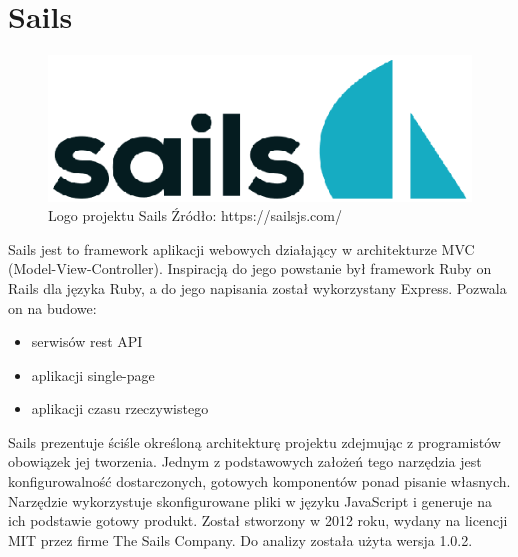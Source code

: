 \documentclass[12pt]{report}
\begin{document}
   \section{Sails}
    \begin{figure}[!hb]
      \centering
      \includegraphics[width=\textwidth,height=\textheight,keepaspectratio]{logo_sails.png} 
      \caption{Logo projektu Sails \newline Źródło: https://sailsjs.com/}
    \end{figure}
    Sails jest to framework aplikacji webowych działający w architekturze MVC (Model-View-Controller).
    Inspiracją do jego powstanie był framework Ruby on Rails dla języka Ruby, a do jego napisania został wykorzystany Express.
    Pozwala on na budowe:
     \begin{itemize}
      \item serwisów rest API
      \item aplikacji single-page 
      \item aplikacji czasu rzeczywistego
    \end{itemize} 
    Sails prezentuje ściśle określoną architekturę projektu zdejmując z programistów obowiązek jej tworzenia.
    Jednym z podstawowych założeń tego narzędzia jest konfigurowalność dostarczonych, gotowych komponentów ponad pisanie własnych.
    Narzędzie wykorzystuje skonfigurowane pliki w języku JavaScript i generuje na ich podstawie gotowy produkt.
    Został stworzony w 2012 roku, wydany na licencji MIT przez firme The Sails Company.
    Do analizy została użyta wersja 1.0.2.
\end{document}
